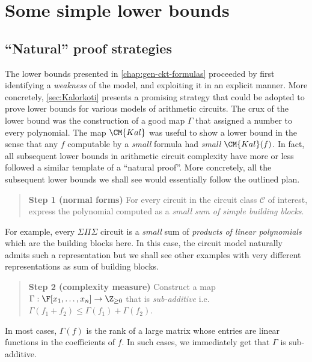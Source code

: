 \chapter{Some simple lower bounds}\label{chap:simpleLBs}


\section{``Natural'' proof strategies}\label{sec:roadmap}

The lower bounds presented in \autoref{chap:gen-ckt-formulas} proceeded by first identifying a \emph{weakness} of the model, and exploiting it in an explicit manner. 
More concretely, \autoref{sec:Kalorkoti} presents a promising strategy that could be adopted to prove lower bounds for various models of arithmetic circuits. 
The crux of the lower bound was the construction of a good map $\Gamma$ that assigned a number to every polynomial. 
The map $\CM{Kal}$ was useful to show a lower bound in the sense that any $f$ computable by a \emph{small} formula had \emph{small} $\CM{Kal}(f)$. 
In fact, all subsequent lower bounds in arithmetic circuit complexity have more or less followed a similar template of a ``natural proof''. 
More concretely, all the subsequent lower bounds we shall see would essentially follow the outlined plan.  

\begin{quote}
{\bf Step 1 (normal forms)} For every circuit in the circuit class $\mathcal{C}$ of interest, express the polynomial computed as a \emph{small sum of simple building blocks}. 
\end{quote}

For example, every $\Sigma\Pi\Sigma$ circuit is a \emph{small} sum of \emph{products of linear polynomials} which are the building blocks here. 
In this case, the circuit model naturally admits such a representation but we shall see other examples with very different representations as sum of building blocks. 

\begin{quote}
{\bf Step 2 (complexity measure)} Construct a map $\Gamma: \F[x_1,\dots, x_n] \rightarrow \Z_{\geq 0}$ that is \emph{sub-additive} i.e. $\Gamma(f_1 + f_2)\leq \Gamma(f_1) + \Gamma(f_2)$.
\end{quote}

In most cases, $\Gamma(f)$ is the rank of a large matrix whose entries are linear functions in the coefficients of $f$. 
In such cases, we immediately get that $\Gamma$ is sub-additive. 

